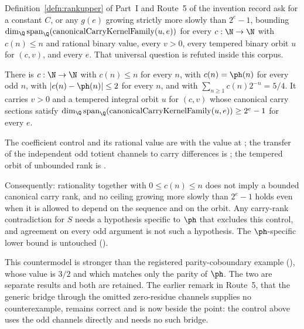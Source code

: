 Definition~\ref{defn:rankupper} of Part~I and Route~5 of the invention record
ask for a constant $C$, or any $g(e)$ growing strictly more slowly than
$2^e-1$, bounding
$\dim_{\Q}\operatorname{span}_{\Q}(\mathrm{canonicalCarryKernelFamily}(u,e))$
for every $c:\N\to\N$ with $c(n)\le n$ and rational binary value, every
$v>0$, every tempered binary orbit $u$ for $(c,v)$, and every $e$. That
universal question is refuted inside this corpus.

\begin{thm}\label{thm:parity-perturbed-control}
There is $c:\N\to\N$ with $c(n)\le n$ for every $n$, with $c(n)=\ph(n)$ for
every odd $n$, with $|c(n)-\ph(n)|\le2$ for every $n$, and with
$\sum_{n\ge1}c(n)2^{-n}=5/4$. It carries $v>0$ and a tempered integral orbit
$u$ for $(c,v)$ whose canonical carry sections satisfy
$\dim_{\Q}\operatorname{span}_{\Q}(\mathrm{canonicalCarryKernelFamily}(u,e))\ge2^e-1$
for every $e$. 
\end{thm}

The coefficient control and its rational value are
with the value at
;
the transfer of the independent odd totient channels to carry differences is
;
the tempered orbit of unbounded rank is
.

Consequently: rationality together with $0\le c(n)\le n$ does not imply a
bounded canonical carry rank, and no ceiling growing more slowly than
$2^e-1$ holds even when it is allowed to depend on the sequence and on the
orbit. Any carry-rank contradiction for $S$ needs a hypothesis specific to
$\ph$ that excludes this control, and agreement on every odd argument is not
such a hypothesis. The $\ph$-specific lower bound is untouched
().

This countermodel is stronger than the registered parity-coboundary example
(),
whose value is $3/2$ and which matches only the parity of $\ph$. The two are
separate results and both are retained. The earlier remark in Route~5, that
the generic bridge through the omitted zero-residue channels supplies no
counterexample, remains correct and is now beside the point: the control above
uses the odd channels directly and needs no such bridge.


